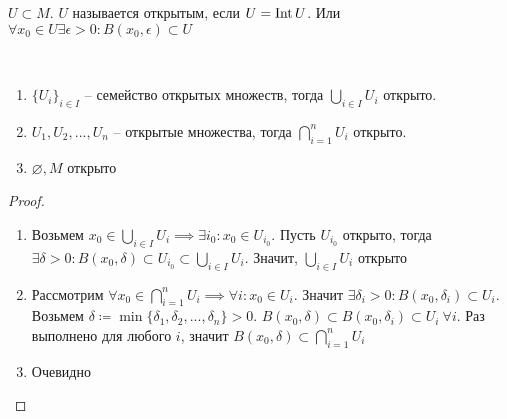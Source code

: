 \documentclass[main]{subfiles}
\begin{document}
\begin{definition}
    $U \subset M$. $U$ называется открытым, если $U= \operatorname{Int} U$.
    Или $\forall x_0 \in U \exists \epsilon > 0: B(x_0, \epsilon) \subset U$
\end{definition}

\begin{theorem}
    \

    \begin{enumerate}
        \item $\{U_i\}_{i \in I}$ -- семейство открытых множеств, тогда $\bigcup_{i \in I} U_i$ открыто.
        \item $U_1, U_2, ..., U_n$ -- открытые множества, тогда $\bigcap_{i=1}^n U_i$  открыто.
        \item $\varnothing, M$ открыто
    \end{enumerate}
\end{theorem}
\begin{proof}
    \

    \begin{enumerate}
        \item Возьмем
              $x_0 \in \bigcup_{i \in I} U_i \implies \exists i_0: x_0 \in U_{i_0}$.
              Пусть $U_{i_0}$ открыто, тогда
              $\exists \delta > 0: B(x_0, \delta) \subset U_{i_0} \subset \bigcup_{i \in I} U_i$.
              Значит, $\bigcup_{i \in I} U_i$ открыто
        \item Рассмотрим $\forall x_0 \in \bigcap_{i=1}^n U_i \implies \forall i: x_0 \in U_i$.
              Значит $\exists \delta_i > 0: B(x_0, \delta_i) \subset U_i$.
              Возьмем $\delta \coloneqq \min \{\delta_1, \delta_2, ..., \delta_n\} > 0$.
              $B(x_0, \delta) \subset B(x_0, \delta_i) \subset U_i\ \forall i$.
              Раз выполнено для любого $i$, значит $B(x_0, \delta) \subset \bigcap_{i=1}^n U_i$
        \item Очевидно \qedhere
    \end{enumerate}
\end{proof}
\end{document}
